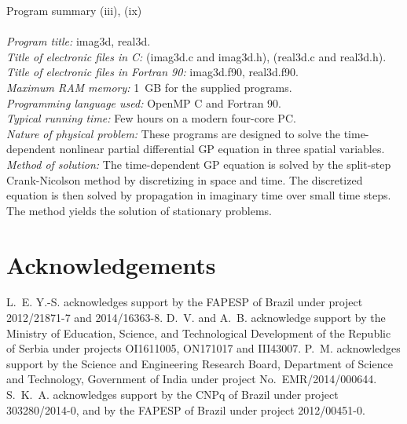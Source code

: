 \documentclass[onecolumn,3p]{elsarticle}
\begin{document}
\begin{small}
\noindent Program summary (iii), (ix)\\
\\
\noindent
{\em Program title:} imag3d, real3d.\\
{\em Title of electronic files in C:} (imag3d.c and imag3d.h), (real3d.c and real3d.h). \\
{\em Title of electronic files in Fortran 90:} imag3d.f90, real3d.f90.\\
{\em Maximum RAM memory:} 1~GB for the supplied programs.\\
{\em Programming language used:} OpenMP C and Fortran 90.\\
{\em Typical running time:} Few hours on a modern four-core PC.\\
{\em Nature of physical problem:} These programs are designed to solve the time-dependent nonlinear partial differential GP equation in three spatial variables. \\
{\em Method of solution:} The time-dependent GP equation is solved by the split-step Crank-Nicolson method by discretizing in space and time. The discretized equation is then solved by propagation in imaginary time over small time steps. The method yields the solution of stationary problems.\\

 
\section*{Acknowledgements}
\noindent
L.~E. Y.-S. acknowledges support by the FAPESP of Brazil under project
2012/21871-7 and 2014/16363-8. D.~V. and A.~B. acknowledge support by the 
Ministry of Education, Science, and Technological Development of the Republic of Serbia under 
projects OI1611005, ON171017 and III43007.
P.~M. acknowledges support by the Science and Engineering Research Board, Department of Science and Technology, Government of India under project No.~EMR/2014/000644.
S.~K.~A. acknowledges support by the CNPq of Brazil under project 303280/2014-0, and by the FAPESP of Brazil under project 2012/00451-0.
 
\end{small}
\end{document}
